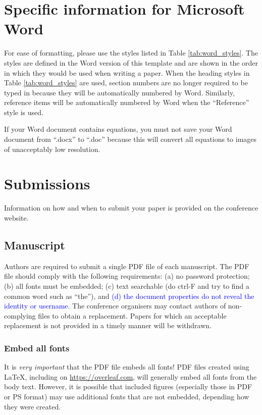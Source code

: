 \documentclass{Interspeech}
\newcommand{\blue}[1]{\textcolor{blue}{#1}}
\begin{document}
\section{Specific information for Microsoft Word}

For ease of formatting, please use the styles listed in Table \ref{tab:word_styles}. The styles are defined in the Word version of this template and are shown in the order in which they would be used when writing a paper. When the heading styles in Table \ref{tab:word_styles} are used, section numbers are no longer required to be typed in because they will be automatically numbered by Word. Similarly, reference items will be automatically numbered by Word when the ``Reference'' style is used.

If your Word document contains equations, you must not save your Word document from ``.docx'' to ``.doc'' because this will convert all equations to images of unacceptably low resolution.

\section{Submissions}

Information on how and when to submit your paper is provided on the conference website.

\subsection{Manuscript}

Authors are required to submit a single PDF file of each manuscript. The PDF file should comply with the following requirements: (a) no password protection; (b) all fonts must be embedded; (c) text searchable (do ctrl-F and try to find a common word such as ``the''), and \blue{(d) the document properties do not reveal the identity or username.} The conference organisers may contact authors of non-complying files to obtain a replacement. Papers for which an acceptable replacement is not provided in a timely manner will be withdrawn.

\subsubsection{Embed all fonts}

It is \textit{very important} that the PDF file embeds all fonts!  PDF files created using \LaTeX, including on \url{https://overleaf.com}, will generally embed all fonts from the body text. However, it is possible that included figures (especially those in PDF or PS format) may use additional fonts that are not embedded, depending how they were created. 
\end{document}
